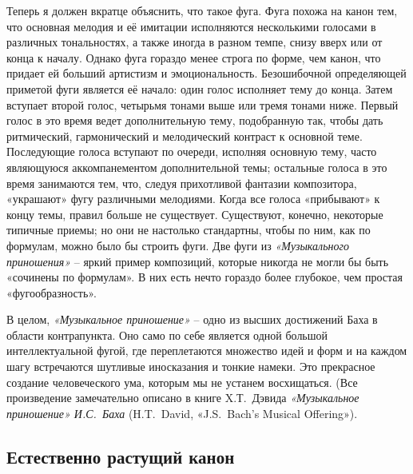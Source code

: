 \documentclass[../main.tex]{subfiles}
\begin{document}
Теперь я должен вкратце объяснить, что такое фуга. Фуга похожа на канон тем, что основная мелодия и её имитации исполняются несколькими голосами в различных тональностях, а также иногда в разном темпе, снизу вверх или от конца к началу. Однако фуга гораздо менее строга по форме, чем канон, что придает ей больший артистизм и эмоциональность. Безошибочной определяющей приметой фуги является её начало: один голос исполняет тему до конца. Затем вступает второй голос, четырьмя тонами выше или тремя тонами ниже. Первый голос в это время ведет дополнительную тему, подобранную так, чтобы дать ритмический, гармонический и мелодический контраст к основной теме. Последующие голоса вступают по очереди, исполняя основную тему, часто являющуюся аккомпанементом дополнительной темы; остальные голоса в это время занимаются тем, что, следуя прихотливой фантазии композитора, «украшают» фугу различными мелодиями. Когда все голоса «прибывают» к концу темы, правил больше не существует. Существуют, конечно, некоторые типичные приемы; но они не настолько стандартны, чтобы по ним, как по формулам, можно было бы строить фуги. Две фуги из \emph{«Музыкального приношения»} \--- яркий пример композиций, которые никогда не могли бы быть «сочинены по формулам». В них есть нечто гораздо более глубокое, чем простая «фугообразность».

В целом, \emph{«Музыкальное приношение»} \--- одно из высших достижений Баха в области контрапункта. Оно само по себе является одной большой интеллектуальной фугой, где переплетаются множество идей и форм и на каждом шагу встречаются шутливые иносказания и тонкие намеки. Это прекрасное создание человеческого ума, которым мы не устанем восхищаться. (Все произведение замечательно описано в книге X.Т.~Дэвида \emph{«Музыкальное приношение» И.С.~Баха} (H.T.~David, «J.S.~Bach's Musical Offering»).


\subsection{Естественно растущий канон}
\end{document}

